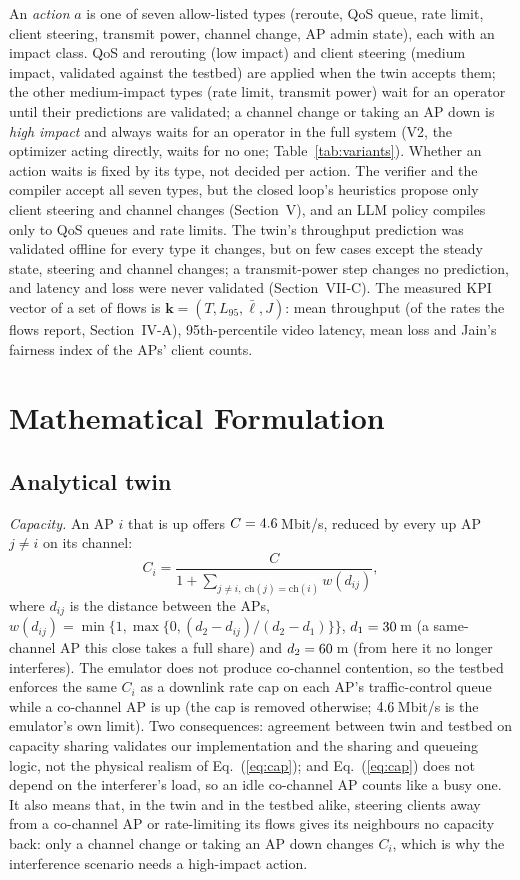 \documentclass[conference]{IEEEtran}
\newcommand{\KPI}{\mathbf{k}}
\begin{document}
An \emph{action} $a$ is one of seven allow-listed types (reroute, QoS queue, rate limit, client steering, transmit power, channel change, AP admin state), each with an impact class. QoS and rerouting (low impact) and client steering (medium impact, validated against the testbed) are applied when the twin accepts them; the other medium-impact types (rate limit, transmit power) wait for an operator until their predictions are validated; a channel change or taking an AP down is \emph{high impact} and always waits for an operator in the full system (V2, the optimizer acting directly, waits for no one; Table~\ref{tab:variants}). Whether an action waits is fixed by its type, not decided per action. The verifier and the compiler accept all seven types, but the closed loop's heuristics propose only client steering and channel changes (Section~V), and an LLM policy compiles only to QoS queues and rate limits. The twin's throughput prediction was validated offline for every type it changes, but on few cases except the steady state, steering and channel changes; a transmit-power step changes no prediction, and latency and loss were never validated (Section~VII-C). The measured KPI vector of a set of flows is $\KPI=(T,L_{95},\bar\ell,J)$: mean throughput (of the rates the flows report, Section~IV-A), 95th-percentile video latency, mean loss and Jain's fairness index \cite{jain1984} of the APs' client counts.

\section{Mathematical Formulation}
\subsection{Analytical twin}
\emph{Capacity.} An AP $i$ that is up offers $C=4.6$\,Mbit/s, reduced by every up AP $j\neq i$ on its channel:
\begin{equation}
\boxed{C_i=\frac{C}{1+\sum_{j\neq i,\ \mathrm{ch}(j)=\mathrm{ch}(i)} w(d_{ij})}},
\label{eq:cap}
\end{equation}
where $d_{ij}$ is the distance between the APs, $w(d_{ij})=\min\{1,\max\{0,(d_2-d_{ij})/(d_2-d_1)\}\}$, $d_1=30$\,m (a same-channel AP this close takes a full share) and $d_2=60$\,m (from here it no longer interferes). The emulator does not produce co-channel contention, so the testbed enforces the same $C_i$ as a downlink rate cap on each AP's traffic-control queue while a co-channel AP is up (the cap is removed otherwise; $4.6$\,Mbit/s is the emulator's own limit). Two consequences: agreement between twin and testbed on capacity sharing validates our implementation and the sharing and queueing logic, not the physical realism of Eq.~(\ref{eq:cap}); and Eq.~(\ref{eq:cap}) does not depend on the interferer's load, so an idle co-channel AP counts like a busy one. It also means that, in the twin and in the testbed alike, steering clients away from a co-channel AP or rate-limiting its flows gives its neighbours no capacity back: only a channel change or taking an AP down changes $C_i$, which is why the interference scenario needs a high-impact action.
\end{document}
